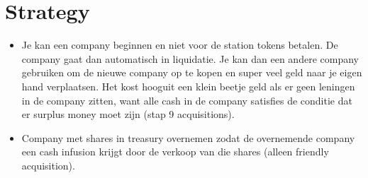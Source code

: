 \documentclass[a4paper,twocolumn]{article}
\begin{document}
\section{Strategy}
\begin{itemize}
	\item Je kan een company beginnen en niet voor de station tokens betalen.
	De company gaat dan automatisch in liquidatie. Je kan dan een andere
	company gebruiken om de nieuwe company op te kopen en super veel geld naar
	je eigen hand verplaatsen. Het kost hooguit een klein beetje geld als er
	geen leningen in de company zitten, want alle cash in de company satisfies
	de conditie dat er surplus money moet zijn (stap 9 acquisitions).
	\item Company met shares in treasury overnemen zodat de overnemende company
	een cash infusion krijgt door de verkoop van die shares (alleen friendly
	acquisition).
\end{itemize}
\end{document}
